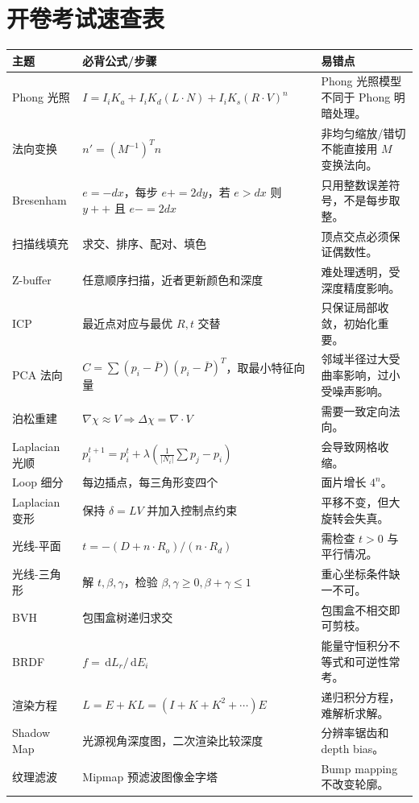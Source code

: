 \documentclass[UTF8,fontset=fandol,11pt]{ctexart}
\newcommand{\key}[1]{\textbf{#1}}
\newcommand{\dd}{\,\mathrm{d}}
\begin{document}
\section{开卷考试速查表}
\begin{longtable}{p{}p{}p{}}
\toprule
\key{主题} & \key{必背公式/步骤} & \key{易错点}\\
\midrule
Phong 光照 & $I=I_iK_a+I_iK_d(L\cdot N)+I_iK_s(R\cdot V)^n$ & Phong 光照模型不同于 Phong 明暗处理。\\
法向变换 & $n'=(M^{-1})^Tn$ & 非均匀缩放/错切不能直接用 $M$ 变换法向。\\
Bresenham & $e=-dx$，每步 $e+=2dy$，若 $e>dx$ 则 $y++$ 且 $e-=2dx$ & 只用整数误差符号，不是每步取整。\\
扫描线填充 & 求交、排序、配对、填色 & 顶点交点必须保证偶数性。\\
Z-buffer & 任意顺序扫描，近者更新颜色和深度 & 难处理透明，受深度精度影响。\\
ICP & 最近点对应与最优 $R,t$ 交替 & 只保证局部收敛，初始化重要。\\
PCA 法向 & $C=\sum(p_i-\bar P)(p_i-\bar P)^T$，取最小特征向量 & 邻域半径过大受曲率影响，过小受噪声影响。\\
泊松重建 & $\nabla\chi\approx V\Rightarrow \Delta\chi=\nabla\cdot V$ & 需要一致定向法向。\\
Laplacian 光顺 & $p_i^{t+1}=p_i^t+\lambda(\frac1{|N_i|}\sum p_j-p_i)$ & 会导致网格收缩。\\
Loop 细分 & 每边插点，每三角形变四个 & 面片增长 $4^n$。\\
Laplacian 变形 & 保持 $\delta=LV$ 并加入控制点约束 & 平移不变，但大旋转会失真。\\
光线-平面 & $t=-(D+n\cdot R_o)/(n\cdot R_d)$ & 需检查 $t>0$ 与平行情况。\\
光线-三角形 & 解 $t,\beta,\gamma$，检验 $\beta,\gamma\ge0,\beta+\gamma\le1$ & 重心坐标条件缺一不可。\\
BVH & 包围盒树递归求交 & 包围盒不相交即可剪枝。\\
BRDF & $f=\dd L_r/\dd E_i$ & 能量守恒积分不等式和可逆性常考。\\
渲染方程 & $L=E+KL=(I+K+K^2+\cdots)E$ & 递归积分方程，难解析求解。\\
Shadow Map & 光源视角深度图，二次渲染比较深度 & 分辨率锯齿和 depth bias。\\
纹理滤波 & Mipmap 预滤波图像金字塔 & Bump mapping 不改变轮廓。\\
\bottomrule
\end{longtable}
\end{document}
